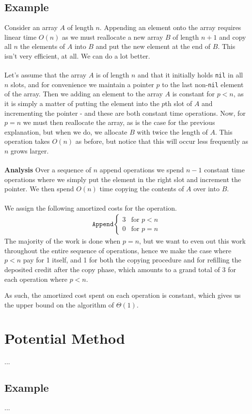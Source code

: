 \subsection{Example}
Consider an array $A$ of length $n$. Appending an element onto the array
requires linear time $O(n)$ as we must reallocate a new array $B$ of length
$n+1$ and copy all $n$ the elements of $A$ into $B$ and put the new element
at the end of $B$. This isn't very efficient, at all. We can do a lot better.
\\\\
Let's assume that the array $A$ is of length $n$ and that it initially holds
\texttt{nil} in all $n$ slots, and for convenience we maintain a pointer $p$
to the last non-\texttt{nil} element of the array. Then we adding an element
to the array $A$ is constant for $p < n$, as it is simply a matter of putting
the element into the $p$th slot of $A$ and incrementing the pointer - and
these are both constant time operations. Now, for $p = n$ we must then
reallocate the array, as is the case for the previous explanation, but when
we do, we allocate $B$ with twice the length of $A$. This operation takes
$O(n)$ as before, but notice that this will occur less frequently as $n$ grows
larger.
\\\\
\noindent \textbf{Analysis}
Over a sequence of $n$ append operations we spend $n - 1$ constant time
operations where we simply put the element in the right slot and increment
the pointer. We then spend $O(n)$ time copying the contents of $A$ over into
$B$.
\\\\
\noindent We assign the following amortized costs for the operation.
\begin{align}
	\texttt{Append}
	\begin{cases}
		3 &\mbox{for } p < n \\
		0 &\mbox{for } p = n
	\end{cases}
\end{align}
The majority of the work is done when $p = n$, but we want to even out this
work throughout the entire sequence of operations, hence we make the case
where $p < n$ pay for 1 itself, and 1 for both the copying procedure and for
refilling the deposited credit after the copy phase, which amounts to a grand
total of 3 for each operation where $p < n$.


As such, the amortized cost spent on each operation is constant, which gives
us the upper bound on the algorithm of $\Theta(1)$.

\section{Potential Method}
...

\subsection{Example}
...

